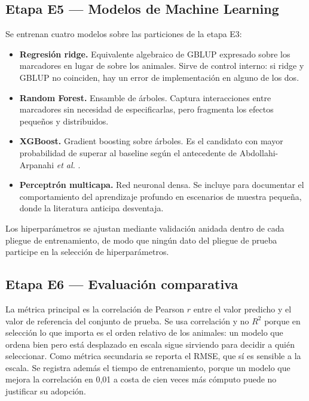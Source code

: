 \documentclass[conference]{IEEEtran}
\begin{document}
\subsection{Etapa E5 — Modelos de Machine Learning}

Se entrenan cuatro modelos sobre las particiones de la etapa E3:

\begin{itemize}
  \item \textbf{Regresión ridge.} Equivalente algebraico de GBLUP
    expresado sobre los marcadores en lugar de sobre los animales. Sirve
    de control interno: si ridge y GBLUP no coinciden, hay un error de
    implementación en alguno de los dos.
  \item \textbf{Random Forest.} Ensamble de árboles. Captura interacciones
    entre marcadores sin necesidad de especificarlas, pero fragmenta los
    efectos pequeños y distribuidos.
  \item \textbf{XGBoost.} Gradient boosting sobre árboles. Es el candidato
    con mayor probabilidad de superar al baseline según el antecedente de
    Abdollahi-Arpanahi \textit{et al.} \cite{abdollahi2020}.
  \item \textbf{Perceptrón multicapa.} Red neuronal densa. Se incluye para
    documentar el comportamiento del aprendizaje profundo en escenarios de
    muestra pequeña, donde la literatura anticipa desventaja.
\end{itemize}

Los hiperparámetros se ajustan mediante validación anidada dentro de cada
pliegue de entrenamiento, de modo que ningún dato del pliegue de prueba
participe en la selección de hiperparámetros.

\subsection{Etapa E6 — Evaluación comparativa}

La métrica principal es la correlación de Pearson $r$ entre el valor
predicho y el valor de referencia del conjunto de prueba. Se usa
correlación y no $R^2$ porque en selección lo que importa es el orden
relativo de los animales: un modelo que ordena bien pero está desplazado
en escala sigue sirviendo para decidir a quién seleccionar. Como métrica
secundaria se reporta el RMSE, que sí es sensible a la escala. Se registra
además el tiempo de entrenamiento, porque un modelo que mejora la
correlación en 0{,}01 a costa de cien veces más cómputo puede no
justificar su adopción.
\end{document}
